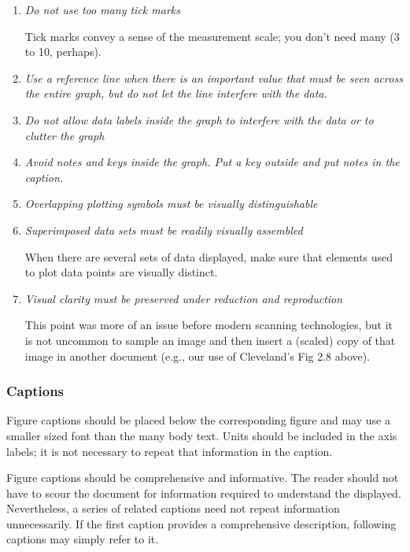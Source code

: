 \begin{enumerate}
\item	\textit{Do not use too many tick marks}

Tick marks convey a sense of the measurement scale; you don’t need many (3 to 10, perhaps).

\item	\textit{Use a reference line when there is an important value that must be seen across the entire graph, but do not let the line interfere with the data.}

\item	\textit{Do not allow data labels inside the graph to interfere with the data or to clutter the graph}

\item	\textit{Avoid notes and keys inside the graph. Put a key outside and put notes in the caption.}

\item	\textit{Overlapping plotting symbols must be visually distinguishable} 

\item	\textit{Superimposed data sets must be readily visually assembled}

When there are several sets of data displayed, make sure that elements used to plot data points are visually distinct.

\item	\textit{Visual clarity must be preserved under reduction and reproduction}

This point was more of an issue before modern scanning technologies, but it is not uncommon to sample an image and then insert a (scaled) copy of that image in another document (e.g., our use of Cleveland's Fig 2.8 above).

\end{enumerate}

\subsubsection{Captions}
Figure captions should be placed below the corresponding figure and may use a smaller sized font than the many body text. Units should be included in the axis labels; it is not necessary to repeat that information in the caption.

Figure captions should be comprehensive and informative. The reader should not have to scour the document for information required to understand the displayed. Nevertheless, a series of related captions need not repeat information unnecessarily. If the first caption provides a comprehensive description, following captions may simply refer to it.

